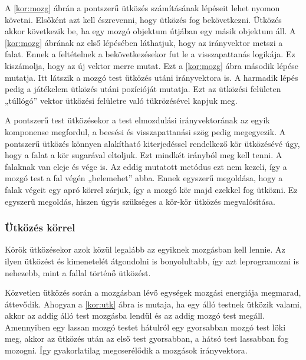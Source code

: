 \documentclass[bibliography=totocnumbered]{article}
\begin{document}
\begin{figure}[ht]
\end{figure}

A \ref{kor:mozg} ábrán a pontszerű ütközés számításának lépéseit lehet nyomon
követni. Elsőként azt kell észrevenni, hogy ütközés fog bekövetkezni.
Ütközés akkor következik be, ha egy mozgó objektum útjában egy másik
objektum áll. A \ref{kor:mozg} ábrának az első lépésében láthatjuk, hogy az
irányvektor metszi a falat. Ennek a feltételnek a bekövetkezésekor fut
le a visszapattanás logikája. Ez kiszámolja, hogy az új vektor merre
mutat. Ezt a \ref{kor:mozg} ábra második lépése mutatja. Itt látszik a mozgó test
ütközés utáni irányvektora is. A harmadik lépés pedig a játékelem
ütközés utáni pozícióját mutatja. Ezt az ütközési felületen „túllógó''
vektor ütközési felületre való tükrözésével kapjuk meg.

A pontszerű test ütközésekor a test elmozdulási irányvektorának az egyik
komponense megfordul, a beesési és visszapattanási szög pedig
megegyezik. A pontszerű ütközés könnyen alakítható kiterjedéssel
rendelkező kör ütközésévé úgy, hogy a falat a kör sugarával eltoljuk.
Ezt mindkét irányból meg kell tenni. A falaknak van eleje és vége is. Az
eddig mutatott metódus ezt nem kezeli, így a mozgó test a fal végén
„belemehet'' abba. Ennek egyszerű megoldása, hogy a falak végeit egy
apró körrel zárjuk, így a mozgó kör majd ezekkel fog ütközni. Ez
egyszerű megoldás, hiszen úgyis szükséges a kör-kör ütközés
megvalósítása.


\subsubsection{Ütközés körrel}

Körök ütközésekor azok közül legalább az egyiknek mozgásban kell lennie.
Az ilyen ütközést és kimenetelét átgondolni is bonyolultabb, így azt
leprogramozni is nehezebb, mint a fallal történő ütközést.

Közvetlen ütközés során a mozgásban lévő egységek mozgási energiája
megmarad, áttevődik. Ahogyan a \ref{kor:utk} ábra is mutaja, ha egy 
álló testnek ütközik valami, akkor az addig
álló test mozgásba lendül és az addig mozgó test megáll. Amennyiben egy
lassan mozgó testet hátulról egy gyorsabban mozgó test löki meg, akkor
az ütközés után az első test gyorsabban, a hátsó test lassabban fog
mozogni. Így gyakorlatilag megcserélődik a mozgások irányvektora.
\end{document}
